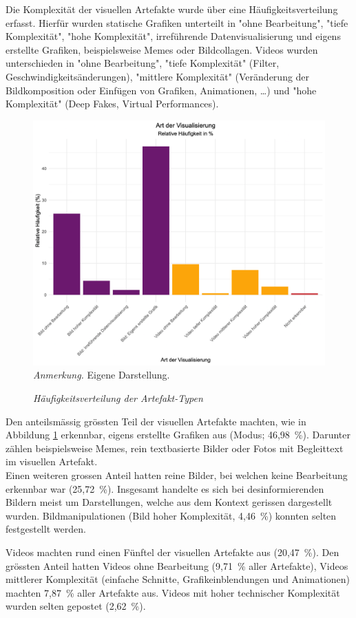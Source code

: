 \documentclass[12pt,a4paper]{article}        %
\begin{document}
Die Komplexität der visuellen Artefakte wurde über eine Häufigkeitsverteilung erfasst. Hierfür wurden statische Grafiken unterteilt in "ohne Bearbeitung", "tiefe Komplexität", "hohe Komplexität", irreführende Datenvisualisierung und eigens erstellte Grafiken, beispielsweise Memes oder Bildcollagen. Videos wurden unterschieden in "ohne Bearbeitung", "tiefe Komplexität" (Filter, Geschwindigkeitsänderungen), "mittlere Komplexität" (Veränderung der Bildkomposition oder Einfügen von Grafiken, Animationen, \ldots) und "hohe Komplexität" (Deep Fakes, Virtual Performances).
\begin{figure}[H]
  \caption{\textit{Häufigkeitsverteilung der Artefakt-Typen}}
  \label{fig:results_artefact_type}
  \centering
  \includegraphics[width=0.75\linewidth]{artefact_type_plot.png}\\
  \footnotesize\textit{Anmerkung.} Eigene Darstellung.
\end{figure}
Den anteilsmässig grössten Teil der visuellen Artefakte machten, wie in Abbildung \ref{fig:results_artefact_type} erkennbar, eigens erstellte Grafiken aus (Modus; 46,98 \%). Darunter zählen beispielsweise Memes, rein textbasierte Bilder oder Fotos mit Begleittext im visuellen Artefakt. \\
Einen weiteren grossen Anteil hatten reine Bilder, bei welchen keine Bearbeitung erkennbar war (25,72 \%). Insgesamt handelte es sich bei desinformierenden Bildern meist um Darstellungen, welche aus dem Kontext gerissen dargestellt wurden. Bildmanipulationen (Bild hoher Komplexität, 4,46 \%) konnten selten festgestellt werden.

Videos machten rund einen Fünftel der visuellen Artefakte aus (20,47 \%). Den grössten Anteil hatten Videos ohne Bearbeitung (9,71 \% aller Artefakte), Videos mittlerer Komplexität (einfache Schnitte, Grafikeinblendungen und Animationen) machten 7,87 \% aller Artefakte aus. Videos mit hoher technischer Komplexität wurden selten gepostet (2,62 \%).
\end{document}
